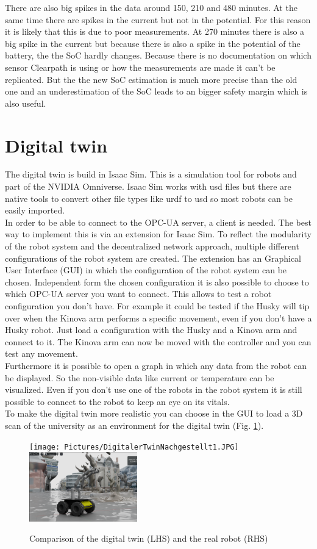 \documentclass[conference]{IEEEtran}
\begin{document}
There are also big spikes in the data around 150, 210 and 480 minutes.
At the same time there are spikes in the current but not in the potential.
For this reason it is likely that this is due to poor measurements.
At 270 minutes there is also a big spike in the current but because there is also a spike in the potential of the battery, the the SoC hardly changes.
Because there is no documentation on which sensor Clearpath is using or how the measurements are made it can't be replicated.
But the the new SoC estimation is much more precise than the old one and an underestimation of the SoC leads to an bigger safety margin which is also useful.
\section{Digital twin}
The digital twin is build in Isaac Sim.
This is a simulation tool for robots and part of the NVIDIA Omniverse.
Isaac Sim works with usd files but there are native tools to convert other file types like urdf to usd so most robots can be easily imported.\\
In order to be able to connect to the OPC-UA server, a client is needed.
The best way to implement this is via an extension for Isaac Sim.
To reflect the modularity of the robot system and the decentralized network approach, multiple different configurations of the robot system are created.
The extension has an Graphical User Interface (GUI) in which the configuration of the robot system can be chosen.
Independent form the chosen configuration it is also possible to choose to which OPC-UA server you want to connect.
This allows to test a robot configuration you don't have. 
For example it could be tested if the Husky will tip over when the Kinova arm performs a specific movement, even if you don't have a Husky robot.
Just load a configuration with the Husky and a Kinova arm and connect to it.
The Kinova arm can now be moved with the controller and you can test any movement.\\
Furthermore it is possible to open a graph in which any data from the robot can be displayed.
So the non-visible data like current or temperature can be visualized.
Even if you don't use one of the robots in the robot system it is still possible to connect to the robot to keep an eye on its vitals.\\
To make the digital twin more realistic you can choose in the GUI to load a 3D scan of the university as an environment for the digital twin (Fig. \ref{fig:CompareDigitalReal}).
\begin{figure}[htbp]
    \centerline{\texttt{[image: Pictures/DigitalerTwinNachgestellt1.JPG]}\hspace{0.1cm}\includegraphics[height=3cm]{Pictures/DigitalerTwinNachgestellt2.png}}
    \caption{Comparison of the digital twin (LHS) and the real robot (RHS)}
    \label{fig:CompareDigitalReal}
\end{figure}
\end{document}
